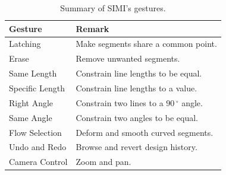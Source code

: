 \documentclass{article}
\begin{document}
\begin{table}[h]
\centering
\begin{tabular}{ p{2.25cm} p{5.5cm} }
\textbf{Gesture} & \textbf{Remark} \\
\hline
Latching & Make segments share a common point.\\
Erase & Remove unwanted segments.\\
Same Length & Constrain line lengths to be equal.\\
Specific Length & Constrain line lengths to a value. \\
Right Angle & Constrain two lines to a $90\,^{\circ}$ angle.\\
Same Angle & Constrain two angles to be equal. \\
Flow Selection & Deform and smooth curved segments.\\
Undo and Redo & Browse and revert design history.\\
Camera Control & Zoom and pan.\\
\end{tabular}
\caption{Summary of SIMI's gestures.}
\label{tab:gestures}
\end{table}
\end{document}
